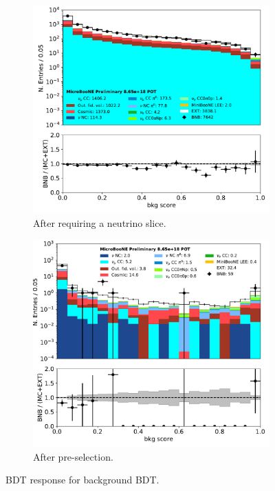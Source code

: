 \documentclass[a4paper]{article}
\begin{document}
\begin{figure}[H] 
\begin{center}
    \begin{subfigure}[b]{0.45\textwidth}
    \centering
    \includegraphics[width=1.00\textwidth]{1e0p/bkg_score_01162020_RUN3_nslice.pdf}
    \caption{\label{fig:1e0p:bdt:bkgscore:slice} After requiring a neutrino slice.}
    \end{subfigure}
    \begin{subfigure}[b]{0.45\textwidth}
    \centering
    \includegraphics[width=1.00\textwidth]{1e0p/bkg_score_01162020_RUN3_presel.pdf}
    \caption{\label{fig:1e0p:bdt:bkgscore:presel} After pre-selection.}
    \end{subfigure}
\caption{\label{fig:1e0p:bdt:bkgscore} BDT response for background BDT.}
\end{center}
\end{figure}
\end{document}
